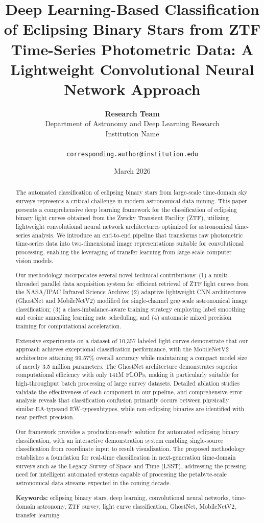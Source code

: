 \documentclass[11pt,a4paper]{article}
\title{\textbf{Deep Learning-Based Classification of Eclipsing Binary Stars from ZTF Time-Series Photometric Data: A Lightweight Convolutional Neural Network Approach}}
\author{
    \textbf{Research Team}\\
    Department of Astronomy and Deep Learning Research\\
    Institution Name\\
    \\ \texttt{corresponding.author@institution.edu}
}
\date{March 2026}
\newcommand{\EA}{EA-type}
\newcommand{\EW}{EW-type}
\begin{document}
\maketitle

\begin{abstract}
The automated classification of eclipsing binary stars from large-scale time-domain sky surveys represents a critical challenge in modern astronomical data mining. This paper presents a comprehensive deep learning framework for the classification of eclipsing binary light curves obtained from the Zwicky Transient Facility (ZTF), utilizing lightweight convolutional neural network architectures optimized for astronomical time-series analysis. We introduce an end-to-end pipeline that transforms raw photometric time-series data into two-dimensional image representations suitable for convolutional processing, enabling the leveraging of transfer learning from large-scale computer vision models.

Our methodology incorporates several novel technical contributions: (1) a multi-threaded parallel data acquisition system for efficient retrieval of ZTF light curves from the NASA/IPAC Infrared Science Archive; (2) adaptive lightweight CNN architectures (GhostNet and MobileNetV2) modified for single-channel grayscale astronomical image classification; (3) a class-imbalance-aware training strategy employing label smoothing and cosine annealing learning rate scheduling; and (4) automatic mixed precision training for computational acceleration.

Extensive experiments on a dataset of 10,357 labeled light curves demonstrate that our approach achieves exceptional classification performance, with the MobileNetV2 architecture attaining 99.57\% overall accuracy while maintaining a compact model size of merely 3.5 million parameters. The GhostNet architecture demonstrates superior computational efficiency with only 141M FLOPs, making it particularly suitable for high-throughput batch processing of large survey datasets. Detailed ablation studies validate the effectiveness of each component in our pipeline, and comprehensive error analysis reveals that classification confusion primarily occurs between physically similar \EA and \EW subtypes, while non-eclipsing binaries are identified with near-perfect precision.

Our framework provides a production-ready solution for automated eclipsing binary classification, with an interactive demonstration system enabling single-source classification from coordinate input to result visualization. The proposed methodology establishes a foundation for real-time classification in next-generation time-domain surveys such as the Legacy Survey of Space and Time (LSST), addressing the pressing need for intelligent automated systems capable of processing the petabyte-scale astronomical data streams expected in the coming decade.

\textbf{Keywords:} eclipsing binary stars, deep learning, convolutional neural networks, time-domain astronomy, ZTF survey, light curve classification, GhostNet, MobileNetV2, transfer learning
\end{abstract}
\end{document}
